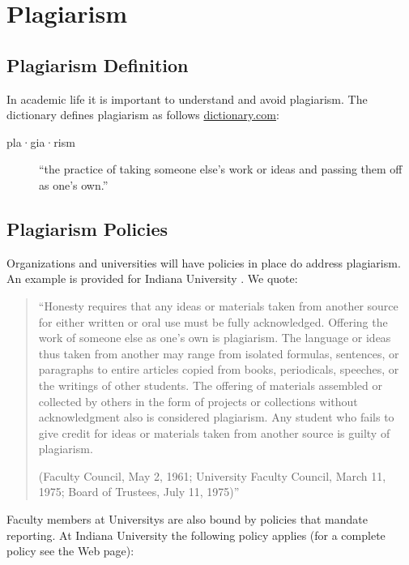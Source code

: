 \FILENAME

\section{Plagiarism}

\subsection{Plagiarism Definition}

In academic life it is important to understand and avoid plagiarism.
The dictionary defines plagiarism as follows \url{dictionary.com}:


\begin{description}
\item[pla·gia·rism] ``the practice of taking someone else's work or ideas and passing them
off as one's own.''
\end{description}



\subsection{Plagiarism Policies}
Organizations and universities will have policies in place do address
plagiarism. An example is provided for Indiana University
\cite{www-iu-plagiarism}. We quote:

\begin{quotation}
``Honesty requires that any ideas or materials taken from
another source for either written or oral use must be fully
acknowledged. Offering the work of someone else as one’s own is
plagiarism. The language or ideas thus taken from another may range
from isolated formulas, sentences, or paragraphs to entire articles
copied from books, periodicals, speeches, or the writings of other
students. The offering of materials assembled or collected by others
in the form of projects or collections without acknowledgment also is
considered plagiarism. Any student who fails to give credit for ideas
or materials taken from another source is guilty of plagiarism. 

(Faculty Council, May 2, 1961; University Faculty Council, March 11,
1975; Board of Trustees, July 11, 1975)''
\end{quotation}

Faculty members at Universitys are also bound by policies that mandate
reporting. At Indiana University the following policy applies (for a
complete policy see the Web page):

